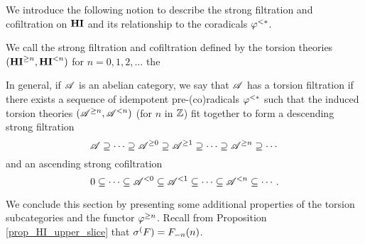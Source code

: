 We introduce the following notion to describe the strong filtration
and cofiltration on $\HI$ and its relationship to the coradicals
$\tlHI{*}$.

\begin{defn}
We call the strong filtration and cofiltration defined by
the torsion theories $(\TGHI{n}{\HI}, \TLHI{n}{\HI})$ for $n = 
0,1,2,\dots$ the 

In general, if $\Cat{A}$ is an abelian category, we say that
$\Cat{A}$ has a torsion filtration if there exists a sequence
of idempotent pre-(co)radicals $\corad{*}$ such that the induced
torsion theories $(\Prerad{n}{\Cat{A}}, \Corad{n}{\Cat{A}})$ (for 
$n$ in $\Z$) fit together to form a descending strong filtration
\[
\Cat{A} \supseteq \cdots \supseteq \Prerad{0}{\Cat{A}} \supseteq
   \Prerad{1}{\Cat{A}} \supseteq \cdots \supseteq \Prerad{n}{\Cat{A}}
   \supseteq \cdots
\]
and an ascending strong cofiltration
\[
0 \subseteq \cdots \subseteq \Corad{0}{\Cat{A}} \subseteq
   \Corad{1}{\Cat{A}} \subseteq \cdots \subseteq \Corad{n}{\Cat{A}}
   \subseteq \cdots.
\]
\end{defn}

We conclude this section by presenting some additional properties of
the torsion subcategories and the functor $\tgHI{n}$. Recall from
Proposition \ref{prop_HI_upper_slice} that $\sgHI(F)=\LHI[n]{\RHI[n]{F}}$.

